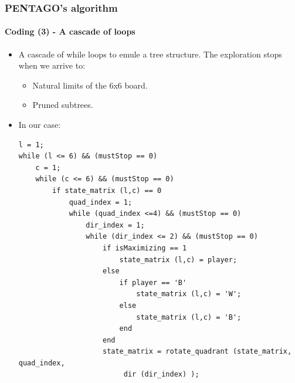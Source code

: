 \documentclass[10pt]{beamer}
\begin{document}
\begin{frame}[fragile]

\frametitle{PENTAGO's algorithm}
\framesubtitle{Coding (3) - A cascade of loops}

\begin{itemize}
  	\item A cascade of while loops to emule a tree structure. The exploration
  	stops when we arrive to:
	
	\begin{itemize}
	  
		\item Natural limits of the 6x6 board.
		\item Pruned subtrees.

	\end{itemize}
	\item In our case:\\

\begin{lstlisting}[basicstyle=\tiny\ttfamily, numberstyle={\tiny
\color{black}}]
l = 1;
while (l <= 6) && (mustStop == 0)   
    c = 1;
    while (c <= 6) && (mustStop == 0)
        if state_matrix (l,c) == 0
            quad_index = 1;
            while (quad_index <=4) && (mustStop == 0)
                dir_index = 1;
                while (dir_index <= 2) && (mustStop == 0)
                    if isMaximizing == 1
                        state_matrix (l,c) = player;
                    else
                        if player == 'B'
                            state_matrix (l,c) = 'W';
                        else
                            state_matrix (l,c) = 'B';
                        end
                    end
                    state_matrix = rotate_quadrant (state_matrix, quad_index,
                    	 dir (dir_index) );
\end{lstlisting}
\end{itemize}

\end{frame}
\end{document}
